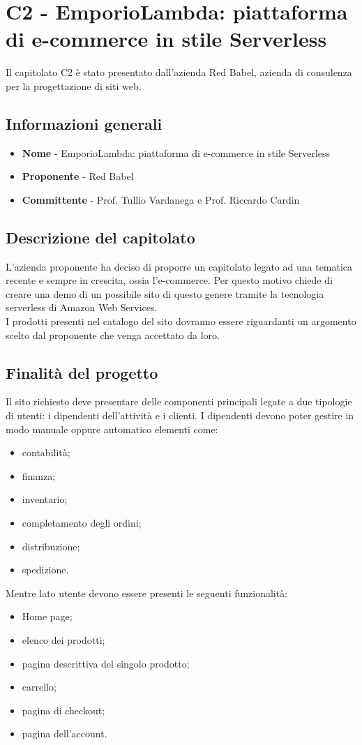 \chapter{C2 - EmporioLambda: piattaforma di e-commerce in stile Serverless}
Il capitolato C2 è stato presentato dall'azienda Red Babel, azienda di consulenza per la progettazione di siti web.
\section{Informazioni generali}
\begin{itemize}
	\item \textbf{Nome} - EmporioLambda: piattaforma di e-commerce in stile Serverless
	\item \textbf{Proponente} - Red Babel
	\item \textbf{Committente} - Prof. Tullio Vardanega e Prof. Riccardo Cardin
\end{itemize}
\section{Descrizione del capitolato}
L'azienda proponente ha deciso di proporre un capitolato legato ad una tematica recente e sempre in crescita, ossia l'e-commerce. Per questo motivo chiede di creare una demo di un possibile sito di questo genere tramite la tecnologia serverless di Amazon Web Services. \\
I prodotti presenti nel catalogo del sito dovranno essere riguardanti un argomento scelto dal proponente che venga accettato da loro.
\section{Finalità del progetto}
Il sito richiesto deve presentare delle componenti principali legate a due tipologie di utenti: i dipendenti dell'attività e i clienti. I dipendenti devono poter gestire in modo manuale oppure automatico elementi come:
\begin{itemize}
	\item  contabilità;
	\item finanza;
	\item inventario;
	\item completamento degli ordini;
	\item distribuzione;
	\item spedizione.
\end{itemize}
Mentre lato utente devono essere presenti le seguenti funzionalità:
\begin{itemize}
	\item Home page;
	\item elenco dei prodotti;
	\item pagina descrittiva del singolo prodotto;
	\item carrello;
	\item pagina di checkout;
	\item pagina dell'account.
\end{itemize}
